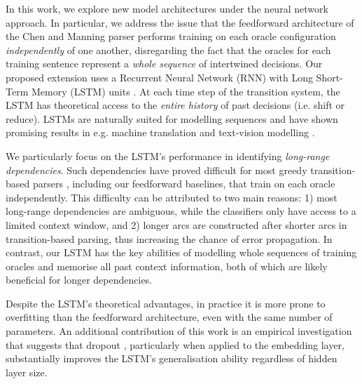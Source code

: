 \documentclass[11pt,a4paper]{article}
\begin{document}
In this work, we explore new model architectures under the neural network approach. In particular, we address the issue that the feedforward architecture of the Chen and Manning parser performs training on each oracle configuration \textit{independently} of one another, disregarding the fact that the oracles for each training sentence represent a \textit{whole sequence} of intertwined decisions. Our proposed extension uses a Recurrent Neural Network (RNN) with Long Short-Term Memory (LSTM) units \cite{HS97}. At each time step of the transition system, the LSTM has theoretical access to the \textit{entire history} of past decisions (i.e. shift or reduce). LSTMs are naturally suited for modelling sequences and have shown promising results in e.g. machine translation \cite{Set14} and text-vision modelling \cite{Vet141}.

\par We particularly focus on the LSTM's performance in identifying \textit{long-range dependencies}. Such dependencies have proved difficult for most greedy transition-based parsers \cite{MN07}, including our feedforward baselines, that train on each oracle independently. This difficulty can be attributed to two main reasons: 1) most long-range dependencies are ambiguous, while the classifiers only have access to a limited context window, and 2) longer arcs are constructed after shorter arcs in transition-based parsing, thus increasing the chance of error propagation. In contrast, our LSTM has the key abilities of modelling  whole sequences of training oracles and memorise all past context information, both of which are likely beneficial for longer dependencies.

\par Despite the LSTM's theoretical advantages, in practice it is more prone to overfitting than the feedforward architecture, even with the same number of parameters. An additional contribution of this work is an empirical investigation that suggests that dropout \cite{Set142}, particularly when applied to the embedding layer, substantially improves the LSTM's generalisation ability regardless of hidden layer size. %














\nocite{*}
\newpage


\end{document}
